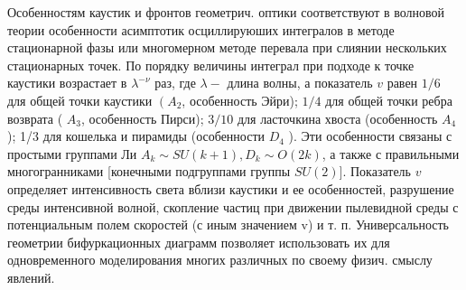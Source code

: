 \documentclass[10pt]{article}
\begin{document}
Особенностям каустик и фронтов геометрич. оптики соответствуют в волновой теории особенности асимптотик осциллируюших интегралов в методе стационарной фазы или многомерном методе перевала при слиянии нескольких стационарных точек. По порядку величины интеграл при подходе к точке каустики возрастает в $\lambda^{-\nu}$ раз, где $\lambda-$ длина волны, а показатель $v$ равен $1 / 6$ для общей точки каустики $\left(A_{2}\right.$, особенность Эйри); $1 / 4$ для общей точки ребра возврата ( $A_{3}$, особенность Пирси); $3 / 10$ для ласточкина хвоста (особенность $A_{4}$ ); 1/3 для кошелька и пирамиды (особенности $D_{4}$ ). Эти особенности связаны с простыми группами Ли $A_{k} \sim S U(k+1), D_{k} \sim O(2 k)$, а также с правильными многогранниками [конечными подгруппами группы $S U(2)]$. Показатель $v$ определяет интенсивность света вблизи каустики и ее особенностей, разрушение среды интенсивной волной, скопление частиц при движении пылевидной среды с потенциальным полем скоростей (с иным значением v) и т. п. Универсальность геометрии бифуркационных диаграмм позволяет использовать их для одновременного моделирования многих различных по своему физич. смыслу явлений.
\end{document}
